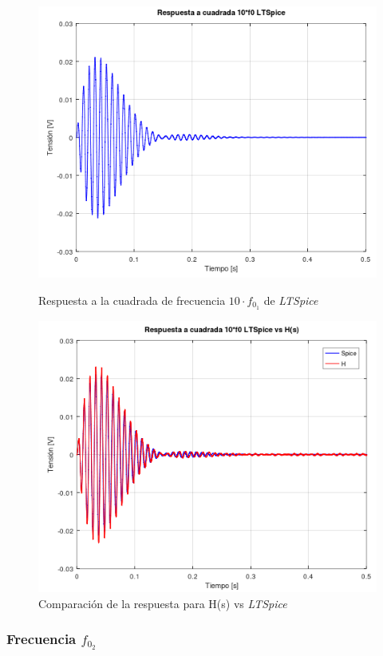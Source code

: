 \documentclass[11pt,a4paper]{report}
\begin{document}
\begin{figure}[h!]
\centering
\includegraphics[scale=0.85]{rtaCuadradaAlto1Spice.png}
\caption{Respuesta a la cuadrada de frecuencia $10 \cdot f_{0_{1}}$ de \textit{LTSpice}}
\includegraphics[scale=0.8]{rtaCuadradaAlto1SpiceComp.png}
\caption{Comparación de la respuesta para H(s) vs \textit{LTSpice}}
\end{figure}
\newpage

\subsubsection*{Frecuencia $f_{0_{2}}$}
\end{document}
